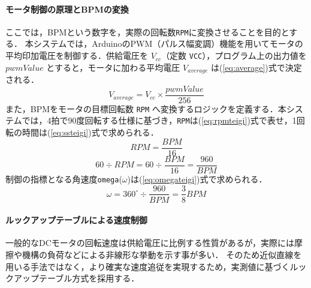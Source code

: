 \documentclass[uplatex,dvipdfmx]{jlreq}
\begin{document}
\paragraph{モータ制御の原理とBPMの変換}
ここでは，BPMという数字を，実際の回転数\texttt{RPM}に変換させることを目的とする．
本システムでは，ArduinoのPWM（パルス幅変調）機能を用いてモータの平均印加電圧を制御する．供給電圧を $V_{cc}$（定数 \texttt{VCC}），プログラム上の出力値を $pwmValue$ とすると，モータに加わる平均電圧 $V_{average}$ は(\ref{eq:average})式で決定される．
\begin{equation}
\label{eq:average}
V_{average} = V_{cc} \times \frac{pwmValue}{256}
\end{equation}
また，BPMをモータの目標回転数 \texttt{RPM} へ変換するロジックを定義する．本システムでは，4拍で90度回転する仕様に基づき，\texttt{RPM}は(\ref{eq:rpmteigi})式で表せ，1回転の時間は(\ref{eq:ssteigi})式で求められる．
\begin{equation}
\label{eq:rpmteigi}
  RPM = \frac{BPM}{16}
\end{equation}
\begin{equation}
\label{eq:ssteigi}
  60 \div RPM = 60 \div \frac{BPM}{16} = \frac{960}{BPM}
\end{equation}
制御の指標となる角速度\texttt{omega}($\omega$)は(\ref{eq:omegateigi})式で求められる．
\begin{equation}
\label{eq:omegateigi}
\omega = 360^\circ \div \frac{960}{BPM} = \frac{3}{8}BPM
\end{equation}

\paragraph{ルックアップテーブルによる速度制御}
一般的なDCモータの回転速度は供給電圧に比例する性質があるが\cite{ref:control}，実際には摩擦や機構の負荷などによる非線形な挙動を示す事が多い．
そのため近似直線を用いる手法ではなく，より確実な速度追従を実現するため，実測値に基づくルックアップテーブル方式を採用する．
\end{document}
